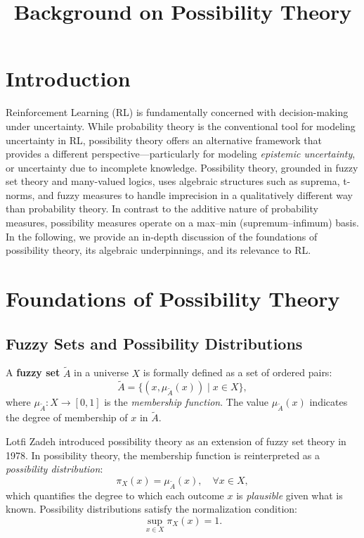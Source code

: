 \documentclass[14pt]{article}
\title{Background on Possibility Theory}
\author{}
\date{}
\begin{document}
\maketitle

\section{Introduction}

Reinforcement Learning (RL) is fundamentally concerned with decision-making under uncertainty. While probability theory is the conventional tool for modeling uncertainty in RL, possibility theory offers an alternative framework that provides a different perspective---particularly for modeling \emph{epistemic uncertainty}, or uncertainty due to incomplete knowledge. Possibility theory, grounded in fuzzy set theory and many-valued logics, uses algebraic structures such as suprema, t-norms, and fuzzy measures to handle imprecision in a qualitatively different way than probability theory. In contrast to the additive nature of probability measures, possibility measures operate on a max--min (supremum--infimum) basis. In the following, we provide an in-depth discussion of the foundations of possibility theory, its algebraic underpinnings, and its relevance to RL.

\section{Foundations of Possibility Theory}

\subsection{Fuzzy Sets and Possibility Distributions}

A \textbf{fuzzy set} $\tilde{A}$ in a universe $X$ is formally defined as a set of ordered pairs:
\[
\tilde{A} = \{ (x, \mu_{\tilde{A}}(x)) \mid x \in X \},
\]
where $\mu_{\tilde{A}}: X \to [0,1]$ is the \emph{membership function}. The value $\mu_{\tilde{A}}(x)$ indicates the degree of membership of $x$ in $\tilde{A}$.

Lotfi Zadeh introduced possibility theory as an extension of fuzzy set theory in 1978. In possibility theory, the membership function is reinterpreted as a \emph{possibility distribution}:
\[
\pi_X(x) = \mu_{\tilde{A}}(x), \quad \forall x \in X,
\]
which quantifies the degree to which each outcome $x$ is \emph{plausible} given what is known. Possibility distributions satisfy the normalization condition:
\[
\sup_{x\in X} \pi_X(x)=1.
\]
\end{document}
